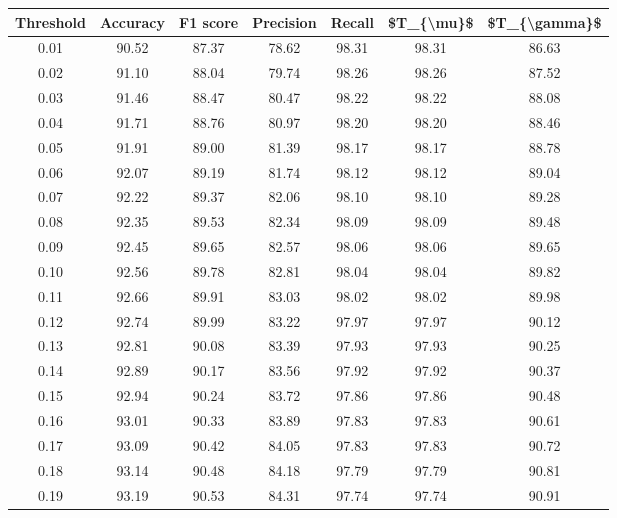 \begin{tabular}{|c|c|c|c|c|c|c|}
\hline
 Threshold &  Accuracy &  F1 score &  Precision &  Recall &  \$T\_\{\textbackslash mu\}\$ &  \$T\_\{\textbackslash gamma\}\$ \\
\hline
      0.01 &     90.52 &     87.37 &      78.62 &   98.31 &      98.31 &         86.63 \\
      0.02 &     91.10 &     88.04 &      79.74 &   98.26 &      98.26 &         87.52 \\
      0.03 &     91.46 &     88.47 &      80.47 &   98.22 &      98.22 &         88.08 \\
      0.04 &     91.71 &     88.76 &      80.97 &   98.20 &      98.20 &         88.46 \\
      0.05 &     91.91 &     89.00 &      81.39 &   98.17 &      98.17 &         88.78 \\
      0.06 &     92.07 &     89.19 &      81.74 &   98.12 &      98.12 &         89.04 \\
      0.07 &     92.22 &     89.37 &      82.06 &   98.10 &      98.10 &         89.28 \\
      0.08 &     92.35 &     89.53 &      82.34 &   98.09 &      98.09 &         89.48 \\
      0.09 &     92.45 &     89.65 &      82.57 &   98.06 &      98.06 &         89.65 \\
      0.10 &     92.56 &     89.78 &      82.81 &   98.04 &      98.04 &         89.82 \\
      0.11 &     92.66 &     89.91 &      83.03 &   98.02 &      98.02 &         89.98 \\
      0.12 &     92.74 &     89.99 &      83.22 &   97.97 &      97.97 &         90.12 \\
      0.13 &     92.81 &     90.08 &      83.39 &   97.93 &      97.93 &         90.25 \\
      0.14 &     92.89 &     90.17 &      83.56 &   97.92 &      97.92 &         90.37 \\
      0.15 &     92.94 &     90.24 &      83.72 &   97.86 &      97.86 &         90.48 \\
      0.16 &     93.01 &     90.33 &      83.89 &   97.83 &      97.83 &         90.61 \\
      0.17 &     93.09 &     90.42 &      84.05 &   97.83 &      97.83 &         90.72 \\
      0.18 &     93.14 &     90.48 &      84.18 &   97.79 &      97.79 &         90.81 \\
      0.19 &     93.19 &     90.53 &      84.31 &   97.74 &      97.74 &         90.91 \\

\end{tabular}
